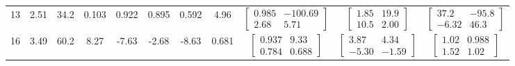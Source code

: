 \begin{landscape}
\begin{table}[H]
\begin{tabular}{ccccccccccc}
		13 & 2.51 & 34.2 & 0.103 & 0.922 & 0.895 & 0.592 & 4.96 & $\begin{bmatrix}0.985 & -100.69 \\ 2.68 & 5.71\end{bmatrix}$ & $\begin{bmatrix}1.85 & 19.9 \\ 10.5 & 2.00\end{bmatrix}$ & $\begin{bmatrix}37.2 & -95.8 \\ -6.32 & 46.3\end{bmatrix}$ \\
		16 & 3.49 & 60.2 & 8.27 & -7.63 & -2.68 & -8.63 & 0.681 & $\begin{bmatrix}0.937 & 9.33 \\ 0.784 & 0.688\end{bmatrix}$ & $\begin{bmatrix}3.87 & 4.34 \\ -5.30 & -1.59\end{bmatrix}$ & $\begin{bmatrix}1.02 & 0.988 \\ 1.52 & 1.02\end{bmatrix}$ \\
		\hline\hline
	\end{tabular}
\end{table}

\end{landscape}

%
%
%
%
%
%
%
%
